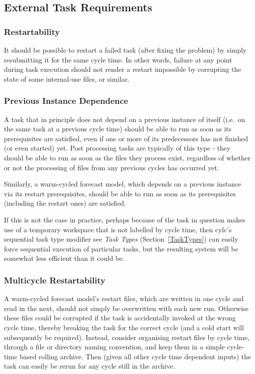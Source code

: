 \documentclass[11pt,a4paper]{article}
\begin{document}
\subsection{External Task Requirements} 
\label{ExternalTaskRequirements}

\subsubsection{Restartability}

It should be possible to restart a failed task (after fixing the
problem) by simply resubmitting it for the same cycle time. In other
words, failure at any point during task execution should not render a
restart impossible by corrupting the state of some internal-use files,
or similar. 

\subsubsection{Previous Instance Dependence} 

A task that in principle does not depend on a previous instance of
itself (i.e.\ on the same task at a previous cycle time) should be able
to run as soon as its prerequisites are satisfied, even if one or more
of its predecessors has not finished (or even started) yet.  Post
processing tasks are typically of this type - they should be able to run
as soon as the files they process exist, regardless of whether or not
the processing of files from any previous cycles has occurred yet.

Similarly, a warm-cycled forecast model, which depends on a previous
instance via its restart prerequisites, should be able to run as soon as
its prerequisites (including the restart ones) are satisfied.

If this is not the case in practice, perhaps because of the task in
question makes use of a temporary workspace that is not labelled by
cycle time, then cylc's sequential task type modifier see {\em Task
Types} (Section~\ref{TaskTypes}) can easily force sequential execution
of particular tasks, but the resulting system will be somewhat less
efficient than it could be.

\subsubsection{Multicycle Restartability} 

A warm-cycled forecast model's restart files, which are written in
one cycle and read in the next, should not simply be overwritten with
each new run. Otherwise these files could be corrupted if the task is
accidentally invoked at the wrong cycle time, thereby breaking the task
for the correct cycle (and a cold start will subsequently be required).
Instead, consider organising restart files by cycle time, through a file
or directory naming convention, and keep them in a simple cycle-time
based rolling archive. Then (given all other cycle time dependent
inputs) the task can easily be rerun for any cycle still in the archive.
\end{document}
